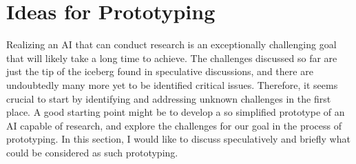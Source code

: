 










\section{Ideas for Prototyping}
Realizing an AI that can conduct research is an exceptionally challenging goal that will likely take a long time to achieve. The challenges discussed so far are just the tip of the iceberg found in speculative discussions, and there are undoubtedly many more yet to be identified critical issues. Therefore, it seems crucial to start by identifying and addressing unknown challenges in the first place. A good starting point might be to develop a so simplified prototype of an AI capable of research, and explore the challenges for our goal in the process of prototyping. In this section, I would like to discuss speculatively and briefly what could be considered as such prototyping.

